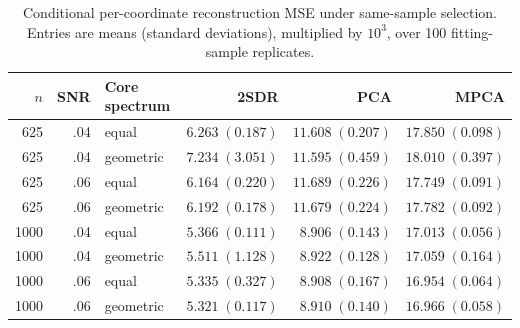 \begin{table}[tbp]
\centering
\small
\caption{Conditional per-coordinate reconstruction MSE under same-sample
selection.  Entries are means (standard deviations), multiplied by
$10^3$, over 100 fitting-sample replicates.}
\label{tab:algorithm-risk}
\begin{tabular}{rrlrrr}
\toprule
$n$ & SNR & Core spectrum & 2SDR & PCA & MPCA\\
\midrule
625  & .04 & equal     & $6.263\;(0.187)$ & $11.608\;(0.207)$ & $17.850\;(0.098)$\\
625  & .04 & geometric & $7.234\;(3.051)$ & $11.595\;(0.459)$ & $18.010\;(0.397)$\\
625  & .06 & equal     & $6.164\;(0.220)$ & $11.689\;(0.226)$ & $17.749\;(0.091)$\\
625  & .06 & geometric & $6.192\;(0.178)$ & $11.679\;(0.224)$ & $17.782\;(0.092)$\\
1000 & .04 & equal     & $5.366\;(0.111)$ & $8.906\;(0.143)$ & $17.013\;(0.056)$\\
1000 & .04 & geometric & $5.511\;(1.128)$ & $8.922\;(0.128)$ & $17.059\;(0.164)$\\
1000 & .06 & equal     & $5.335\;(0.327)$ & $8.908\;(0.167)$ & $16.954\;(0.064)$\\
1000 & .06 & geometric & $5.321\;(0.117)$ & $8.910\;(0.140)$ & $16.966\;(0.058)$\\
\bottomrule
\end{tabular}
\end{table}
